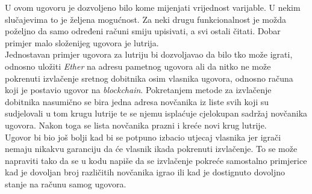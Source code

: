\documentclass[times, utf8, zavrsni, numeric]{fer}
\begin{document}
U ovom ugovoru je dozvoljeno bilo kome mijenjati vrijednost varijable. U nekim slučajevima to je željena mogućnost. Za neki drugu funkcionalnost je možda poželjno da
samo određeni računi smiju upisivati, a svi ostali čitati. Dobar primjer malo složenijeg ugovora je lutrija. \\
Jednostavan primjer ugovora za lutriju bi dozvoljavao da bilo tko može igrati, odnosno uložiti \emph{Ether} na adresu pametnog ugovora ali da nitko ne može pokrenuti
izvlačenje sretnog dobitnika osim vlasnika ugovora, odnosno računa koji je postavio ugovor na \emph{blockchain}. Pokretanjem metode za izvlačenje dobitnika nasumično
se bira jedna adresa novčanika iz liste svih koji su sudjelovali u tom krugu lutrije te se njemu isplaćuje cjelokupan sadržaj novčanika ugovora. Nakon toga se lista
novčanika prazni i kreće novi krug lutrije. \\
Ugovor bi bio još bolji kad bi se potpuno izbacio utjecaj vlasnika jer igrači nemaju nikakvu garanciju da će vlasnik ikada pokrenuti izvlačenje. To se može napraviti
tako da se u kodu napiše da se izvlačenje pokreće samostalno primjerice kad je dovoljan broj različitih novčanika igrao ili kad je dostignuto dovoljno stanje na računu
samog ugovora.
\end{document}
